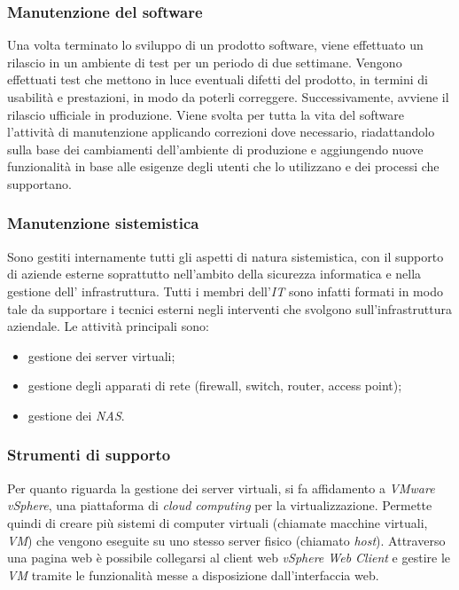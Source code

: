  \subsubsection{Manutenzione del software}
Una volta terminato lo sviluppo di un prodotto software, viene effettuato un rilascio in un ambiente di test per un periodo di due settimane. Vengono effettuati test che mettono in luce eventuali difetti del prodotto, in termini di usabilità e prestazioni, in modo da poterli correggere. Successivamente, avviene il rilascio ufficiale in produzione. 
Viene svolta per tutta la vita del software l'attività di manutenzione applicando correzioni dove necessario, riadattandolo sulla base dei cambiamenti dell'ambiente di produzione e aggiungendo nuove funzionalità in base alle esigenze degli utenti che lo utilizzano e dei processi che supportano.
 
 \subsubsection{Manutenzione sistemistica}
Sono gestiti internamente tutti gli aspetti di natura sistemistica, con il supporto di aziende esterne soprattutto nell'ambito della sicurezza informatica e nella gestione dell' infrastruttura. Tutti i membri dell'\textit{IT} sono infatti formati in modo tale da supportare i tecnici esterni negli interventi che svolgono sull'infrastruttura aziendale. Le attività principali sono:
\begin{itemize}
	\item gestione dei server virtuali;
	\item gestione degli apparati di rete (firewall, switch, router, access point);
	\item gestione dei \textit{NAS}.
\end{itemize}

\subsubsection{Strumenti di supporto}
Per quanto riguarda la gestione dei server virtuali, si fa affidamento a \textit{VMware vSphere}, una piattaforma di \textit{cloud computing} per la virtualizzazione. Permette quindi di creare più sistemi di computer virtuali (chiamate macchine virtuali, \textit{VM}) che vengono eseguite su uno stesso server fisico (chiamato \textit{host}). Attraverso una pagina web è possibile collegarsi al client web \textit{vSphere Web Client} e gestire le \textit{VM} tramite le funzionalità messe a disposizione dall'interfaccia web.


